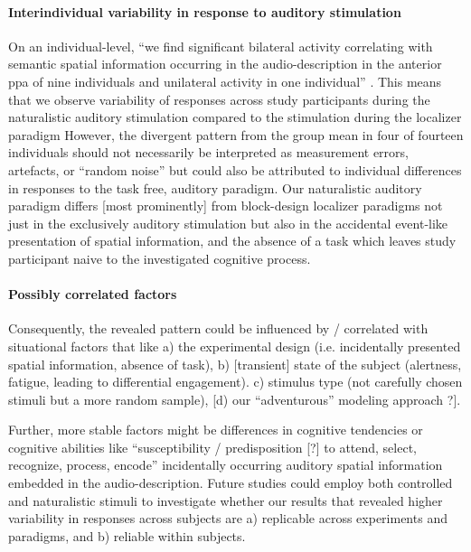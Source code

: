 \paragraph{Interindividual variability in response to auditory stimulation}

On an individual-level, ``we find significant bilateral activity correlating
with semantic spatial information occurring in the audio-description in the
anterior \ac{ppa} of nine individuals and unilateral activity in one
individual'' \citep{haeusler2022processing}.
This means that we observe variability of responses across study participants
during the naturalistic auditory stimulation compared to the stimulation during
the localizer paradigm \citep[cf.][]{sengupta2016extension}
However, the divergent pattern from the group mean in four of fourteen
individuals should not necessarily be interpreted as measurement errors,
artefacts, or ``random noise'' but could also be attributed to individual
differences in responses to the task free, auditory paradigm.
%
Our naturalistic auditory paradigm differs [most prominently] from block-design
localizer paradigms not just in the exclusively auditory stimulation but also in
the accidental event-like presentation of spatial information, and the absence
of a task which leaves study participant naive to the investigated cognitive
process.


\paragraph{Possibly correlated factors}

Consequently, the revealed pattern could be influenced by / correlated with
situational factors that like
%
a) the experimental design (i.e. incidentally presented spatial information,
absence of task),
%
b) [transient] state of the subject (alertness, fatigue, leading to differential
engagement).
c) stimulus type (not carefully chosen stimuli but a more random sample),
%
[d) our ``adventurous'' modeling approach ?].

%
Further, more stable factors might be differences in cognitive tendencies or
cognitive abilities like ``susceptibility / predisposition [?] to attend,
select, recognize, process, encode'' incidentally occurring auditory spatial
information embedded in the audio-description.
Future studies could employ both controlled and naturalistic stimuli to
investigate whether our results that revealed higher variability in responses
across subjects are a) replicable across experiments and paradigms, and b)
reliable within subjects.


